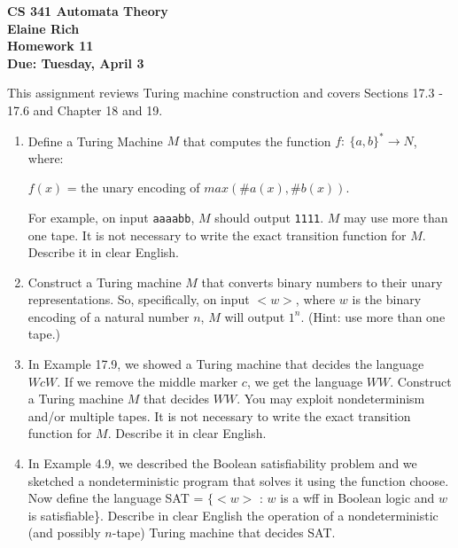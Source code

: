 \documentclass[10pt]{article}
\begin{document}
\begin{center}
\textbf{
CS 341 Automata Theory \\
Elaine Rich \\
Homework 11 \\
Due: Tuesday, April 3}\\
\end{center}
\noindent
This assignment reviews Turing machine construction and covers Sections 17.3 - 17.6 and Chapter 18 and 19. \\

\begin{enumerate}[1)]


\item
Define a Turing Machine $M$ that computes the function $f:\ \{a, b\}^* \rightarrow N$, where:\\
\begin{center}
$f(x)$ = the unary encoding of $max(\#a(x), \#b(x))$.  
\end{center}
For example, on input \texttt{aaaabb}, $M$ should output \texttt{1111}.  $M$ may use more than one tape.  It is not necessary to 
write the exact transition function for $M$.  Describe it in clear English.


\item
Construct a Turing machine $M$ that converts binary numbers to their unary representations.  So, specifically, on 
input $<w>$, where $w$ is the binary encoding of a natural number $n$, $M$ will output $1^n$.  (Hint: use more than one tape.)


\item
In Example 17.9, we showed a Turing machine that decides the language $WcW$.  If we remove the middle 
marker $c$, we get the language $WW$.  Construct a Turing machine $M$ that decides $WW$.  You may exploit 
nondeterminism and/or multiple tapes.  It is not necessary to write the exact transition function for $M$.  Describe 
it in clear English.



\item
In Example 4.9, we described the Boolean satisfiability problem and we sketched a nondeterministic program 
that solves it using the function choose.  Now define the language SAT = $\{<w>$ : $w$ is a wff in Boolean logic 
and $w$ is satisfiable\}.  Describe in clear English the operation of a nondeterministic (and possibly $n$-tape) Turing 
machine that decides SAT.



\end{enumerate}
\end{document}

